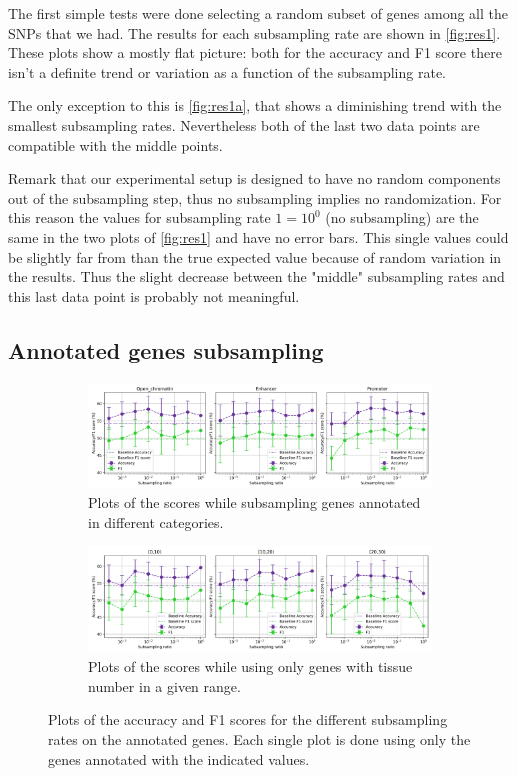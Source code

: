 The first simple tests were done selecting a random subset of genes among all the SNPs that we had. The results for each subsampling rate are shown in \autoref{fig:res1}.
These plots show a mostly flat picture: both for the accuracy and F1 score there isn't a definite trend or variation as a function of the subsampling rate.

The only exception to this is \autoref{fig:res1a}, that shows a diminishing trend with the smallest subsampling rates. Nevertheless both of the last two data points are compatible with the middle points.

Remark that our experimental setup is designed to have no random components out of the subsampling step, thus no subsampling implies no randomization. For this reason the values for subsampling rate $1 = 10^0$ (no subsampling) are the same in the two plots of \autoref{fig:res1} and have no error bars.
This single values could be slightly far from than the true expected value because of random variation in the results. Thus the slight decrease between the "middle" subsampling rates and this last data point is probably not meaningful. 

\subsection{Annotated genes subsampling}
\begin{figure}[ht!]
\centering
\begin{subfigure}[ht]{\textwidth}
    \centering
    \includegraphics[width=\textwidth]{figures/subsample_annotated.png}
\caption{Plots of the scores while subsampling genes annotated in different categories.}
\label{fig:res2a}
\end{subfigure}

\begin{subfigure}[ht]{\textwidth}
\centering
\includegraphics[width=\textwidth]{figures/subsample_ntissue.png}
\caption{Plots of the scores while using only genes with tissue number in a given range.}
\label{fig:res2b}
\end{subfigure}
\caption{Plots of the accuracy and F1 scores for the different subsampling rates on the annotated genes. Each single plot is done using only the genes annotated with the indicated values.}
\label{fig:res2}
\end{figure}


